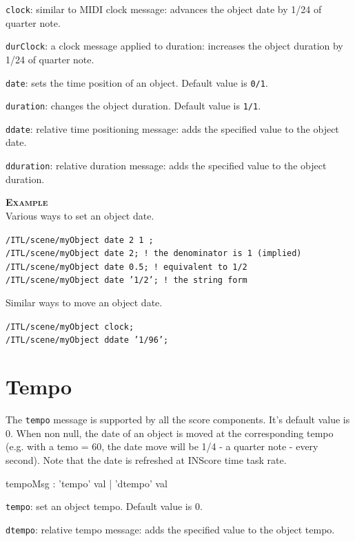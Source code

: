 \documentclass[a4paper,twoside]{report}
\newcommand{\sublevel}[1]	{\section{#1}}
\newcommand{\OSC}[1]		{\texttt{#1}}
\newcommand{\values}[1]		{\texttt{#1}}
\newcommand{\example}		{\textbf{\hspace{-1.5cm}\textbf{\textsc{Example }}}}
\let\olditemize\itemize
\let\oldenditemize\enditemize
\renewenvironment{itemize} 	{\olditemize \setlength{\itemsep}{1mm}}{\oldenditemize}
\newcommand{\sample}	[1]			{\vspace{-2mm}\begin{center}\colorbox{mygrey}{
								\begin{minipage}[t]{0.9\columnwidth} 
								{\small \texttt{#1}}
								\end{minipage}}\end{center}}
\begin{document}
\begin{itemize}
\item \OSC{clock}: similar to MIDI clock message: advances the object date by 1/24 of quarter note.
\item \OSC{durClock}: a clock message applied to duration: increases the object duration by 1/24 of quarter note.
\item \OSC{date}: sets the time position of an object. Default value is \values{0/1}.
\item \OSC{duration}: changes the object duration. Default value is \values{1/1}.
\item \OSC{ddate}: relative time positioning message: adds the specified value to the object date.
\item \OSC{dduration}: relative duration message: adds the specified value to the object duration.
\end{itemize}


\example \\
Various ways to set an object date.
\sample{/ITL/scene/myObject date 2 1 ;\\
/ITL/scene/myObject date 2;     \hspace{1.2cm}! the denominator is 1 (implied) \\
/ITL/scene/myObject date 0.5;   \hspace{7mm} ! equivalent to 1/2 \\
/ITL/scene/myObject date '1/2'; \hspace{4mm} ! the string form
}
Similar ways to move an object date.
\sample{/ITL/scene/myObject clock;   \\
/ITL/scene/myObject ddate '1/96';
}

\sublevel{Tempo}\label{tempo}
The \OSC{tempo} message is supported by all the score components. It's default value is 0. When non null, the date of an object is moved at the corresponding tempo (e.g. with a temo = 60, the date move will be 1/4 - a quarter note - every second). Note that the date is refreshed at INScore time task rate.
\begin{rail}
tempoMsg : 'tempo' val
		| 'dtempo' val
\end{rail}

\begin{itemize}
\item \OSC{tempo}: set an object tempo. Default value is 0.
\item \OSC{dtempo}: relative tempo message: adds the specified value to the object tempo.
\end{itemize}
\end{document}
